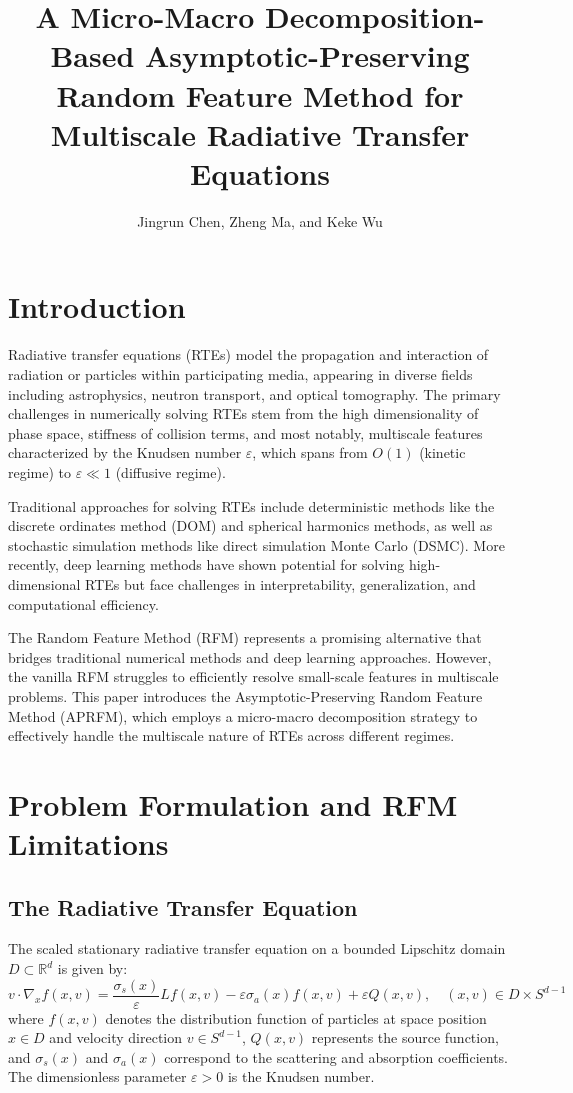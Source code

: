 \documentclass[11pt]{article}
\title{A Micro-Macro Decomposition-Based Asymptotic-Preserving\\Random Feature Method for Multiscale Radiative Transfer Equations}
\author{Jingrun Chen, Zheng Ma, and Keke Wu}
\date{}
\begin{document}
\maketitle

\section{Introduction}

Radiative transfer equations (RTEs) model the propagation and interaction of radiation or particles within participating media, appearing in diverse fields including astrophysics, neutron transport, and optical tomography. The primary challenges in numerically solving RTEs stem from the high dimensionality of phase space, stiffness of collision terms, and most notably, multiscale features characterized by the Knudsen number $\varepsilon$, which spans from $O(1)$ (kinetic regime) to $\varepsilon \ll 1$ (diffusive regime).

Traditional approaches for solving RTEs include deterministic methods like the discrete ordinates method (DOM) and spherical harmonics methods, as well as stochastic simulation methods like direct simulation Monte Carlo (DSMC). More recently, deep learning methods have shown potential for solving high-dimensional RTEs but face challenges in interpretability, generalization, and computational efficiency.

The Random Feature Method (RFM) represents a promising alternative that bridges traditional numerical methods and deep learning approaches. However, the vanilla RFM struggles to efficiently resolve small-scale features in multiscale problems. This paper introduces the Asymptotic-Preserving Random Feature Method (APRFM), which employs a micro-macro decomposition strategy to effectively handle the multiscale nature of RTEs across different regimes.

\section{Problem Formulation and RFM Limitations}

\subsection{The Radiative Transfer Equation}

The scaled stationary radiative transfer equation on a bounded Lipschitz domain $D \subset \mathbb{R}^d$ is given by:
\begin{equation}
v \cdot \nabla_x f(x,v) = \frac{\sigma_s(x)}{\varepsilon} L f(x,v) - \varepsilon \sigma_a(x) f(x,v) + \varepsilon Q(x,v), \quad (x,v) \in D \times S^{d-1}
\end{equation}
where $f(x,v)$ denotes the distribution function of particles at space position $x \in D$ and velocity direction $v \in S^{d-1}$, $Q(x,v)$ represents the source function, and $\sigma_s(x)$ and $\sigma_a(x)$ correspond to the scattering and absorption coefficients. The dimensionless parameter $\varepsilon > 0$ is the Knudsen number.
\end{document}
